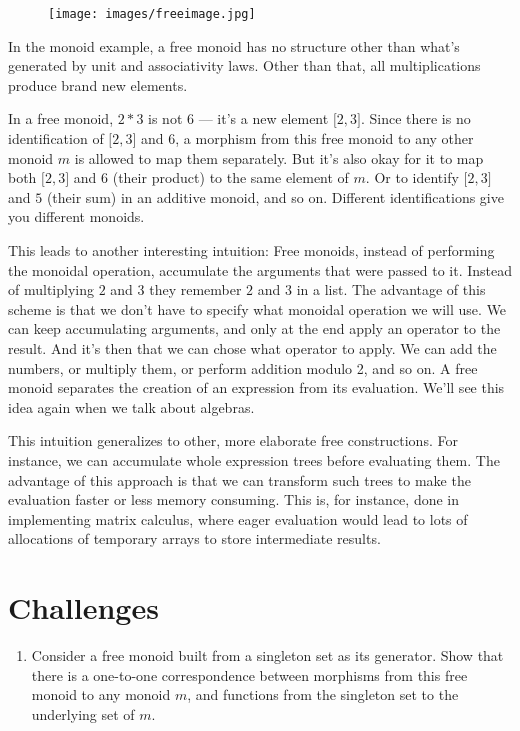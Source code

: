 \begin{figure}[H]
\centering
\texttt{[image: images/freeimage.jpg]}
\end{figure}

\noindent
In the monoid example, a free monoid has no structure other than what's
generated by unit and associativity laws. Other than that, all
multiplications produce brand new elements.

In a free monoid, $2 * 3$ is not $6$ --- it's a new element ${[}2, 3{]}$. Since
there is no identification of ${[}2, 3{]}$ and $6$, a morphism from this
free monoid to any other monoid $m$ is allowed to map them
separately. But it's also okay for it to map both ${[}2, 3{]}$ and $6$
(their product) to the same element of $m$. Or to identify ${[}2,
3{]}$ and $5$ (their sum) in an additive monoid, and so on. Different
identifications give you different monoids.

This leads to another interesting intuition: Free monoids, instead of
performing the monoidal operation, accumulate the arguments that were
passed to it. Instead of multiplying $2$ and $3$ they remember $2$ and $3$ in a
list. The advantage of this scheme is that we don't have to specify what
monoidal operation we will use. We can keep accumulating arguments, and
only at the end apply an operator to the result. And it's then that we
can chose what operator to apply. We can add the numbers, or multiply
them, or perform addition modulo 2, and so on. A free monoid separates
the creation of an expression from its evaluation. We'll see this idea
again when we talk about algebras.

This intuition generalizes to other, more elaborate free constructions.
For instance, we can accumulate whole expression trees before evaluating
them. The advantage of this approach is that we can transform such trees
to make the evaluation faster or less memory consuming. This is, for
instance, done in implementing matrix calculus, where eager evaluation
would lead to lots of allocations of temporary arrays to store
intermediate results.

\section{Challenges}

\begin{enumerate}
\tightlist
\item
  Consider a free monoid built from a singleton set as its generator.
  Show that there is a one-to-one correspondence between morphisms from
  this free monoid to any monoid $m$, and functions from the
  singleton set to the underlying set of $m$.
\end{enumerate}